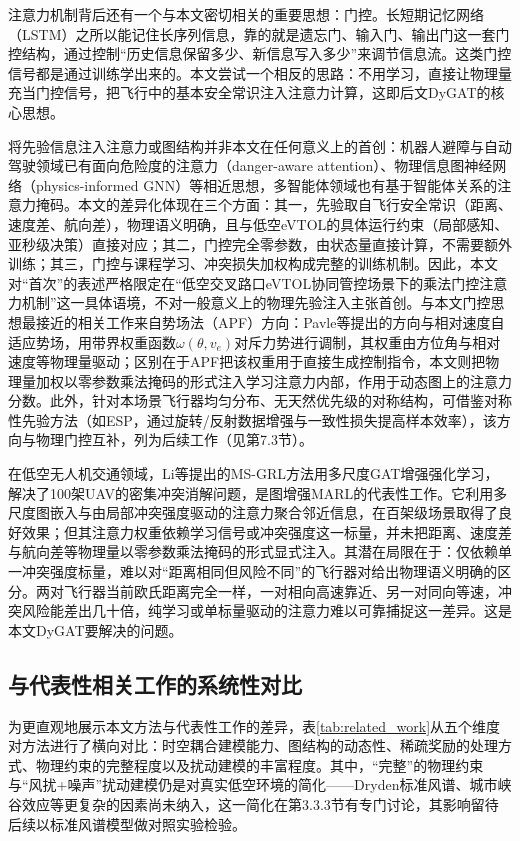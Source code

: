 \documentclass[12pt,a4paper,UTF8]{ctexart}
\begin{document}
注意力机制背后还有一个与本文密切相关的重要思想：门控。长短期记忆网络（LSTM）\cite{ref37}之所以能记住长序列信息，靠的就是遗忘门、输入门、输出门这一套门控结构，通过控制“历史信息保留多少、新信息写入多少”来调节信息流。这类门控信号都是通过训练学出来的。本文尝试一个相反的思路：不用学习，直接让物理量充当门控信号，把飞行中的基本安全常识注入注意力计算，这即后文DyGAT的核心思想。

将先验信息注入注意力或图结构并非本文在任何意义上的首创：机器人避障与自动驾驶领域已有面向危险度的注意力（danger-aware attention）、物理信息图神经网络（physics-informed GNN）等相近思想\cite{ref55}，多智能体领域也有基于智能体关系的注意力掩码。本文的差异化体现在三个方面：其一，先验取自飞行安全常识（距离、速度差、航向差），物理语义明确，且与低空eVTOL的具体运行约束（局部感知、亚秒级决策）直接对应；其二，门控完全零参数，由状态量直接计算，不需要额外训练；其三，门控与课程学习、冲突损失加权构成完整的训练机制。因此，本文对“首次”的表述严格限定在“低空交叉路口eVTOL协同管控场景下的乘法门控注意力机制”这一具体语境，不对一般意义上的物理先验注入主张首创。与本文门控思想最接近的相关工作来自势场法（APF）方向：Pavle等\cite{ref56}提出的方向与相对速度自适应势场，用带界权重函数$\omega(\theta, v_e)$对斥力势进行调制，其权重由方位角与相对速度等物理量驱动；区别在于APF把该权重用于直接生成控制指令，本文则把物理量加权以零参数乘法掩码的形式注入学习注意力内部，作用于动态图上的注意力分数。此外，针对本场景飞行器均匀分布、无天然优先级的对称结构，可借鉴对称性先验方法（如ESP\cite{ref57}，通过旋转/反射数据增强与一致性损失提高样本效率），该方向与物理门控互补，列为后续工作（见第7.3节）。

在低空无人机交通领域，Li等\cite{ref10}提出的MS-GRL方法用多尺度GAT增强强化学习，解决了100架UAV的密集冲突消解问题，是图增强MARL的代表性工作。它利用多尺度图嵌入与由局部冲突强度驱动的注意力聚合邻近信息，在百架级场景取得了良好效果；但其注意力权重依赖学习信号或冲突强度这一标量，并未把距离、速度差与航向差等物理量以零参数乘法掩码的形式显式注入。其潜在局限在于：仅依赖单一冲突强度标量，难以对“距离相同但风险不同”的飞行器对给出物理语义明确的区分。两对飞行器当前欧氏距离完全一样，一对相向高速靠近、另一对同向等速，冲突风险能差出几十倍，纯学习或单标量驱动的注意力难以可靠捕捉这一差异。这是本文DyGAT要解决的问题。

\subsection{与代表性相关工作的系统性对比}

为更直观地展示本文方法与代表性工作的差异，表\ref{tab:related_work}从五个维度对方法进行了横向对比：时空耦合建模能力、图结构的动态性、稀疏奖励的处理方式、物理约束的完整程度以及扰动建模的丰富程度。其中，“完整”的物理约束与“风扰+噪声”扰动建模仍是对真实低空环境的简化——Dryden标准风谱、城市峡谷效应等更复杂的因素尚未纳入，这一简化在第3.3.3节有专门讨论，其影响留待后续以标准风谱模型做对照实验检验。
\end{document}
